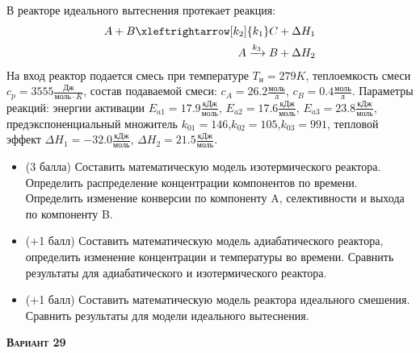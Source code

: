  В реакторе идеального вытеснения протекает реакция: \begin{equation*} \begin{aligned} A+B \xleftrightarrow[k_2]{k_1} C +\Delta H_1 \\ A \xrightarrow{k_3} B + \Delta H_2 \end{aligned} \end{equation*}                                     На вход  реактор подается смесь при температуре $ T_н =  279 K$, теплоемкость смеси $c_p= 3555 \frac{Дж}{моль \cdot K}$, состав подаваемой смеси: $c_A=26.2 \frac{моль}{л}$, $c_B=0.4 \frac{моль}{л}$. Параметры реакций: энергии активации $E_{a1}=17.9 \frac{кДж}{моль}$, $E_{a2}=17.6  \frac{кДж}{моль}$, $E_{a3}=23.8  \frac{кДж}{моль}$, предэкспоненциальный множитель $k_{01}=       146$,$k_{02}=       105$,$k_{03}=       991$, тепловой эффект $\Delta H_1= -32.0  \frac{кДж}{моль}$, $\Delta H_2=21.5 \frac{кДж}{моль}$.\begin{itemize} \item (3 балла) Составить математическую модель изотермического реактора. Определить распределение концентрации компонентов по времени. Определить изменение конверсии по компоненту A, селективности и выхода по компоненту B. \item (+1 балл) Составить математическую модель адиабатического реактора, определить изменение концентрации и температуры во времени. Сравнить результаты для адиабатического и изотермического реактора. \item (+1 балл) Составить математическую модель реактора идеального смешения. Сравнить результаты для модели идеального вытеснения. \end{itemize}

\textsc{\textbf{Вариант 29}}


